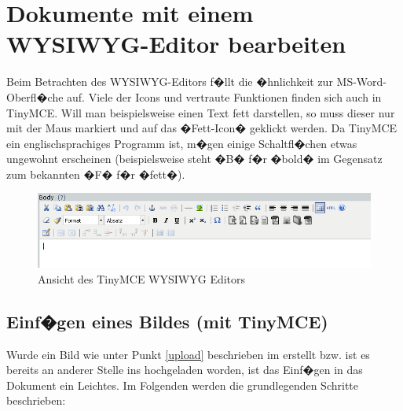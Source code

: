 \section{Dokumente mit einem WYSIWYG-Editor bearbeiten}
\label{wysiwig}
\label{allgemeines-wysiwig}

Beim Betrachten des WYSIWYG-Editors  f�llt die �hnlichkeit zur MS-Word-
Oberfl�che auf. Viele der Icons und vertraute Funktionen finden sich auch in
TinyMCE. Will man beispielsweise einen Text fett darstellen, so muss dieser nur
mit der Maus markiert und auf das �Fett-Icon� geklickt werden.
Da TinyMCE ein englischsprachiges Programm ist, m�gen einige Schaltfl�chen
etwas ungewohnt erscheinen (beispielsweise steht �B� f�r �bold� im Gegensatz zum
bekannten �F� f�r �fett�).

\begin{figure}[!ht]
	\centering
		\includegraphics[width=\textwidth]{./images/tinymce-edit.png}
	\caption{Ansicht des TinyMCE WYSIWYG Editors}
	\label{fig:tinymceedit}
\end{figure}

\subsection{Einf�gen eines Bildes (mit TinyMCE)}
\label{insimage}

Wurde ein Bild wie unter Punkt \ref{upload} beschrieben im  erstellt bzw. ist es bereits an
anderer Stelle ins  hochgeladen worden, ist das Einf�gen in das Dokument ein
Leichtes. Im Folgenden werden die grundlegenden Schritte beschrieben:

